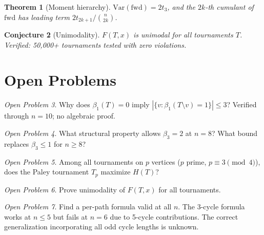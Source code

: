 \documentclass[12pt,reqno]{amsart}
\theoremstyle{plain}
\newtheorem{theorem}{Theorem}[section]
\newtheorem{conjecture}[theorem]{Conjecture}
\theoremstyle{definition}
\theoremstyle{remark}
\newtheorem{openquestion}[theorem]{Open Problem}
\begin{document}
\begin{theorem}[Moment hierarchy]
$\mathrm{Var}(\mathrm{fwd}) = 2t_3$, and the $2k$-th cumulant of $\mathrm{fwd}$
has leading term $2t_{2k+1}/\binom{n}{2k}$.
\end{theorem}

\begin{conjecture}[Unimodality]
$F(T, x)$ is unimodal for all tournaments $T$. Verified: 50{,}000+
tournaments tested with zero violations.
\end{conjecture}

\section{Open Problems}\label{sec:open}

\begin{openquestion}
Why does $\beta_1(T) = 0$ imply $|\{v : \beta_1(T \setminus v) = 1\}| \leq 3$?
Verified through $n = 10$; no algebraic proof.
\end{openquestion}

\begin{openquestion}
What structural property allows $\beta_3 = 2$ at $n = 8$? What bound replaces
$\beta_3 \leq 1$ for $n \geq 8$?
\end{openquestion}


\begin{openquestion}
Among all tournaments on $p$ vertices ($p$ prime, $p \equiv 3 \pmod{4}$),
does the Paley tournament $T_p$ maximize $H(T)$?
\end{openquestion}

\begin{openquestion}
Prove unimodality of $F(T, x)$ for all tournaments.
\end{openquestion}

\begin{openquestion}
Find a per-path formula valid at all $n$. The 3-cycle formula works at
$n \leq 5$ but fails at $n = 6$ due to 5-cycle contributions. The correct
generalization incorporating all odd cycle lengths is unknown.
\end{openquestion}

\end{document}
